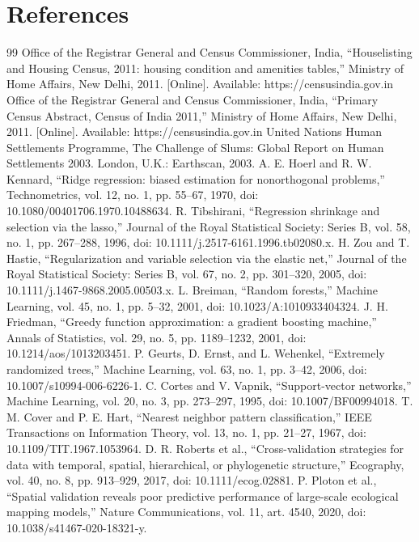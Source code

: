 \documentclass[conference]{IEEEtran}
\begin{document}
\section*{References}
\small
\begin{thebibliography}{99}
 Office of the Registrar General and Census Commissioner, India, “Houselisting and Housing Census, 2011: housing condition and amenities tables,” Ministry of Home Affairs, New Delhi, 2011. [Online]. Available: https://censusindia.gov.in
 Office of the Registrar General and Census Commissioner, India, “Primary Census Abstract, Census of India 2011,” Ministry of Home Affairs, New Delhi, 2011. [Online]. Available: https://censusindia.gov.in
 United Nations Human Settlements Programme, The Challenge of Slums: Global Report on Human Settlements 2003. London, U.K.: Earthscan, 2003.
 A. E. Hoerl and R. W. Kennard, “Ridge regression: biased estimation for nonorthogonal problems,” Technometrics, vol. 12, no. 1, pp. 55–67, 1970, doi: 10.1080/00401706.1970.10488634.
 R. Tibshirani, “Regression shrinkage and selection via the lasso,” Journal of the Royal Statistical Society: Series B, vol. 58, no. 1, pp. 267–288, 1996, doi: 10.1111/j.2517-6161.1996.tb02080.x.
 H. Zou and T. Hastie, “Regularization and variable selection via the elastic net,” Journal of the Royal Statistical Society: Series B, vol. 67, no. 2, pp. 301–320, 2005, doi: 10.1111/j.1467-9868.2005.00503.x.
 L. Breiman, “Random forests,” Machine Learning, vol. 45, no. 1, pp. 5–32, 2001, doi: 10.1023/A:1010933404324.
 J. H. Friedman, “Greedy function approximation: a gradient boosting machine,” Annals of Statistics, vol. 29, no. 5, pp. 1189–1232, 2001, doi: 10.1214/aos/1013203451.
 P. Geurts, D. Ernst, and L. Wehenkel, “Extremely randomized trees,” Machine Learning, vol. 63, no. 1, pp. 3–42, 2006, doi: 10.1007/s10994-006-6226-1.
 C. Cortes and V. Vapnik, “Support-vector networks,” Machine Learning, vol. 20, no. 3, pp. 273–297, 1995, doi: 10.1007/BF00994018.
 T. M. Cover and P. E. Hart, “Nearest neighbor pattern classification,” IEEE Transactions on Information Theory, vol. 13, no. 1, pp. 21–27, 1967, doi: 10.1109/TIT.1967.1053964.
 D. R. Roberts et al., “Cross-validation strategies for data with temporal, spatial, hierarchical, or phylogenetic structure,” Ecography, vol. 40, no. 8, pp. 913–929, 2017, doi: 10.1111/ecog.02881.
 P. Ploton et al., “Spatial validation reveals poor predictive performance of large-scale ecological mapping models,” Nature Communications, vol. 11, art. 4540, 2020, doi: 10.1038/s41467-020-18321-y.

\end{thebibliography}
\end{document}
